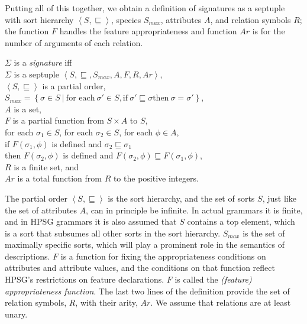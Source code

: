 \documentclass[output=paper
                ,modfonts
                ,nonflat
	        ,collection
	        ,collectionchapter
	        ,collectiontoclongg
 	        ,biblatex
                ,babelshorthands
                ,newtxmath
                ,draftmode
                ,colorlinks, citecolor=brown
]{./langsci/langscibook}
\begin{document}
{{Putting all of this together, we obtain a definition of signatures
as a septuple with sort hierarchy $\left<S,\sqsubseteq\right>$, species
$S_{max}$, attributes $A$, and relation symbols $R$; the function $F$ handles
the feature appropriateness and function $Ar$ is for the number of arguments
of each relation.

\begin{mydef}\label{def-signature}
  $\Sigma$ is a \emph{signature} iff\\
  $\Sigma$ is a septuple $\left<S,\sqsubseteq,S_{max},A,F,R,Ar\right>$,\\
  $\left<S,\sqsubseteq\right>$ is a partial order,\\
  $S_{max} = \left\{\sigma\in S\ |\ \mbox{for each}\ \sigma' \in S, \mbox{if}\ \sigma'\sqsubseteq\sigma \mbox{then}\ \sigma=\sigma'\right\}$,\\
  $A$ is a set,\\
  $F$ is a partial function from $S\times A$ to $S$,\\
  for each $\sigma_1\in S$, for each $\sigma_2\in S$, for each $\phi\in A$,\\
  \hspace*{.5cm} if $F(\sigma_1,\phi)$ is defined and $\sigma_2\sqsubseteq\sigma_1$\\
  \hspace*{.5cm} then $F(\sigma_2,\phi)$ is defined and
             $F(\sigma_2,\phi)\sqsubseteq F(\sigma_1,\phi)$,\\
  $R$ is a finite set, and\\
  $Ar$ is a total function from $R$ to the positive integers.
\end{mydef}

The partial order $\left<S,\sqsubseteq\right>$ is the sort hierarchy,
and the set of sorts $S$, just like the set of attributes $A$, can in principle
be infinite. In actual grammars it is finite, and in HPSG grammars it is
also assumed that $S$ contains a top element, which is a sort that subsumes
all other sorts in the sort hierarchy. $S_{max}$ is the set of maximally
specific sorts, which will play a prominent role in the semantics of
descriptions. $F$ is a function for fixing the appropriateness conditions
on attributes and attribute values, and the conditions on that function
reflect HPSG's restrictions on feature declarations. $F$ is called the
\emph{(feature) appropriateness function}. The last two lines of
the definition provide the set of relation symbols, $R$, with their arity, $Ar$.
We assume that relations are at least unary.

}}
\end{document}
